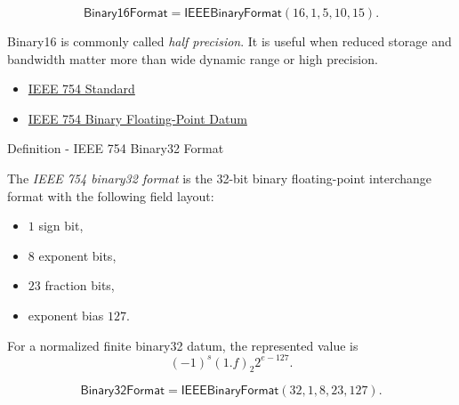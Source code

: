 \begin{remark*}
\[
\mathsf{Binary16Format}
=\mathsf{IEEEBinaryFormat}(16,1,5,10,15).
\]
\end{remark*}

\begin{remark*}[Interpretation]
Binary16 is commonly called \emph{half precision}. It is useful when reduced storage
and bandwidth matter more than wide dynamic range or high precision.
\end{remark*}

\begin{remark*}[Exposition]
\end{remark*}

\begin{dependencies}
\begin{itemize}
  \item \hyperref[def:numerical-analysis-ieee-754-standard]{IEEE 754 Standard}
  \item \hyperref[def:numerical-analysis-ieee-754-binary-floating-point-datum]{IEEE 754 Binary Floating-Point Datum}
\end{itemize}
\end{dependencies}


\begin{definitionbox}{Definition - IEEE 754 Binary32 Format}
\begin{definition}
\label{def:numerical-analysis-ieee-754-binary32-format}
The \emph{IEEE 754 binary32 format} is the 32-bit binary floating-point interchange format
with the following field layout:

\begin{itemize}
    \item $1$ sign bit,
    \item $8$ exponent bits,
    \item $23$ fraction bits,
    \item exponent bias $127$.
\end{itemize}

For a normalized finite binary32 datum, the represented value is
\[
(-1)^s (1.f)_2 2^{e-127}.
\]
\end{definition}
\end{definitionbox}

\begin{remark*}
\[
\mathsf{Binary32Format}
=\mathsf{IEEEBinaryFormat}(32,1,8,23,127).
\]
\end{remark*}

